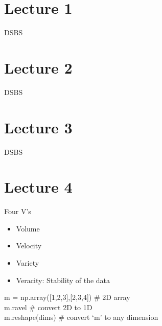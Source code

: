 \documentclass[12pt]{report}
\title{
\author{Devansh Tripathi\\ Lecturer: Prof. M.P. Rajan}
}
\begin{document}
\maketitle
\section*{Lecture 1}
DSBS
\section*{Lecture 2}
DSBS
\section*{Lecture 3}
DSBS
\section*{Lecture 4}
Four V's
\begin{itemize}
    \item Volume
    \item Velocity
    \item Variety
    \item Veracity: Stability of the data
\end{itemize}
m = np.array([1,2,3],[2,3,4]) \# 2D array\\
m.ravel \# convert 2D to 1D\\
m.reshape(dims) \# convert `m' to any dimension 
\end{document}
